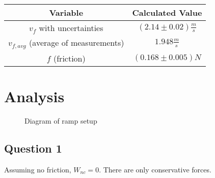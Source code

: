 \documentclass{article}
\begin{document}
\begin{center}
    \begin{tabular}{|c|c|}
        \hline
        Variable                              & Calculated Value              \\
        \hline \hline
        $v_f$ with uncertainties              & $(2.14 \pm 0.02) \frac{m}{s}$ \\
        \hline
        $v_{f,avg}$ (average of measurements) & $1.948 \frac{m}{s}$           \\
        \hline
        $f$ (friction)                        & $(0.168 \pm 0.005)N$          \\
        \hline
    \end{tabular}
\end{center}

\newpage
\section{Analysis}

\begin{figure}[H]
    \centering
    \caption{Diagram of ramp setup}
    \label{fig:diagram}
\end{figure}

\newpage
\subsection{Question 1}

Assuming no friction, $W_{nc} = 0$. There are only conservative forces.
\end{document}
